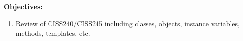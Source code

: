 \textbf{Objectives:}
\begin{enumerate}[topsep=0pt]
\item Review of CISS240/CISS245 including classes, objects, instance variables,
methods, templates, etc.
\end{enumerate}
